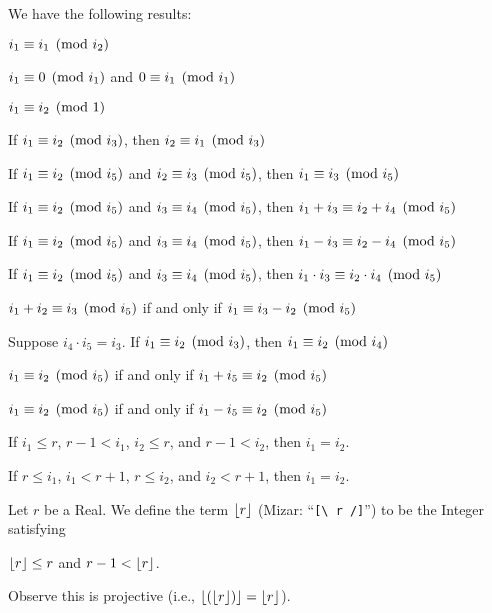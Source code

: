 \documentclass{article}
\begin{document}
We have the following results:
\begin{thm}
\item\label{int1:11} $i_{1}\equiv i_{1}\pmod{i_{2}}$
\item\label{int1:12} $i_{1}\equiv0\pmod{i_{1}}$ and $0\equiv i_{1}\pmod{i_{1}}$
\item\label{int1:13} $i_{1}\equiv i_{2}\pmod{1}$
\item\label{int1:14} If $i_{1}\equiv i_{2}\pmod{i_{3}}$, then
  $i_{2}\equiv i_{1}\pmod{i_{3}}$
\item\label{int1:15} If $i_{1}\equiv i_{2}\pmod{i_{5}}$
  and $i_{2}\equiv i_{3}\pmod{i_{5}}$,
  then $i_{1}\equiv i_{3}\pmod{i_{5}}$
\item\label{int1:16} If $i_{1}\equiv i_{2}\pmod{i_{5}}$
  and $i_{3}\equiv i_{4}\pmod{i_{5}}$,
  then $i_{1}+i_{3}\equiv i_{2}+i_{4}\pmod{i_{5}}$
\item\label{int1:17} If $i_{1}\equiv i_{2}\pmod{i_{5}}$
  and $i_{3}\equiv i_{4}\pmod{i_{5}}$,
  then $i_{1}-i_{3}\equiv i_{2}-i_{4}\pmod{i_{5}}$
\item\label{int1:18} If $i_{1}\equiv i_{2}\pmod{i_{5}}$
  and $i_{3}\equiv i_{4}\pmod{i_{5}}$,
  then $i_{1}\cdot i_{3}\equiv i_{2}\cdot i_{4}\pmod{i_{5}}$
\item\label{int1:19} $i_{1}+i_{2}\equiv i_{3}\pmod{i_{5}}$ if and only if
  $i_{1}\equiv i_{3}-i_{2}\pmod{i_{5}}$
\item\label{int1:20} Suppose $i_{4}\cdot i_{5}=i_{3}$.
  If $i_{1}\equiv i_{2}\pmod{i_{3}}$, then $i_{1}\equiv i_{2}\pmod{i_{4}}$
\item\label{int1:21} $i_{1}\equiv i_{2}\pmod{i_{5}}$ if and only if
  $i_{1}+i_{5}\equiv i_{2}\pmod{i_{5}}$
\item\label{int1:22} $i_{1}\equiv i_{2}\pmod{i_{5}}$ if and only if
  $i_{1}-i_{5}\equiv i_{2}\pmod{i_{5}}$
\item\label{int1:23} If $i_{1}\leq r$, $r-1<i_{1}$, $i_{2}\leq r$, and
  $r-1<i_{2}$, then $i_{1}=i_{2}$.
\item\label{int1:24} If $r\leq i_{1}$, $i_{1}<r+1$, $r\leq i_{2}$,
  and $i_{2}<r+1$, then $i_{1}=i_{2}$.
\end{thm}

\begin{definition}
Let $r$ be a Real. We define the term $\lfloor r \rfloor$ (Mizar: ``\verb#[\ r /]#'')
to be the Integer satisfying
\begin{defn}
\item $\lfloor r \rfloor\leq r$ and $r-1<\lfloor r \rfloor$.
\end{defn}
Observe this is projective (i.e., $\lfloor (\lfloor r \rfloor) \rfloor=\lfloor r \rfloor$).
\end{definition}
\end{document}
